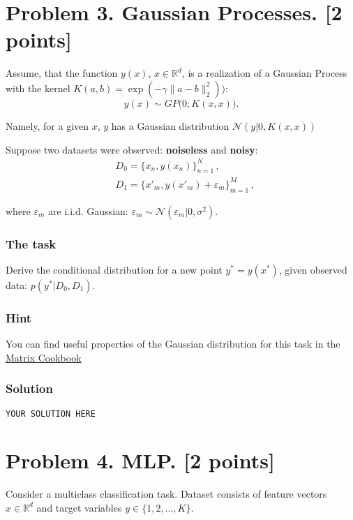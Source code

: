 \documentclass{article}
\begin{document}
\section*{Problem 3. Gaussian Processes. [2 points]}

Assume, that the function $y(x)$, $x \in \mathbb{R}^d$, is a realization of a Gaussian
Process with the kernel $K(a, b) = \exp({- \gamma \|a - b\|_2^2}))$:
\begin{equation}
y(x) \sim GP\bigl(0; K(x, x)\bigr).
\end{equation}

Namely, for a given $x$, $y$ has a Gaussian distribution $\mathcal{N}(y|0, K(x, x))$


Suppose two datasets were observed: \textbf{noiseless} and \textbf{noisy}:
\begin{align}
    & D_0 = \{ x_n, y(x_n) \}_{n=1}^{N} \,, \\
    & D_1 = \{x'_m, y(x'_m) + \varepsilon_m \}_{m=1}^{M} \,,
\end{align}

where $\varepsilon_m$ are i.i.d. Gaussian:  $\varepsilon_m \sim \mathcal{N}(\varepsilon_m | 0, \sigma^2)$.

\subsubsection*{The task}
Derive the conditional distribution for a new point $y^* = y(x^*)$, given observed data: $p(y^* \big\vert {D_0, D_1})$.

\subsubsection*{Hint} You can find useful properties of the Gaussian distribution for this task in the \href{http://www.math.uwaterloo.ca/~hwolkowi//matrixcookbook.pdf}{Matrix Cookbook}

\subsubsection*{Solution}
\texttt{YOUR SOLUTION HERE}

\section*{Problem 4. MLP. [2 points]}
Consider a multiclass classification task. Dataset consists of feature vectors $x \in \mathbb{R}^d$ and target variables $y \in \{1, 2, \dots, K\}$.
\end{document}
